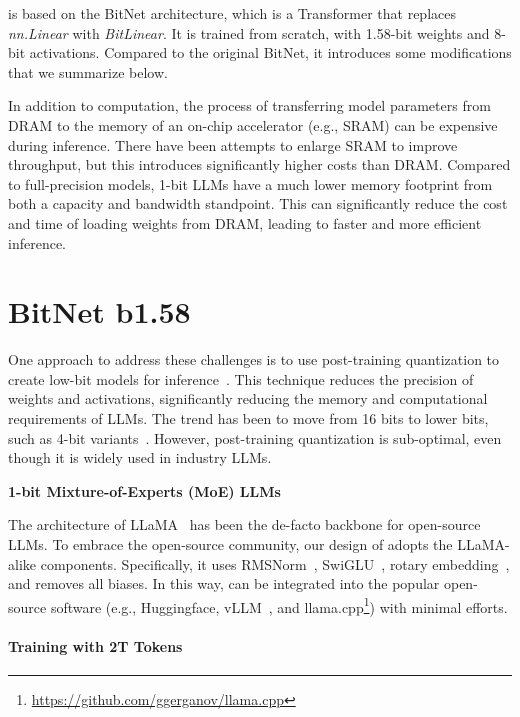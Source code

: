  is based on the BitNet architecture, which is a Transformer that replaces \emph{nn.Linear} with \emph{BitLinear}. It is trained from scratch, with 1.58-bit weights and 8-bit activations. Compared to the original BitNet, it introduces some modifications that we summarize below.

In addition to computation, the process of transferring model parameters from DRAM to the memory of an on-chip accelerator (e.g., SRAM) can be expensive during inference. There have been attempts to enlarge SRAM to improve throughput, but this introduces significantly higher costs than DRAM. Compared to full-precision models, 1-bit LLMs have a much lower memory footprint from both a capacity and bandwidth standpoint. This can significantly reduce the cost and time of loading weights from DRAM, leading to faster and more efficient inference.

\section{BitNet b1.58}

One approach to address these challenges is to use post-training quantization to create low-bit models for inference~\cite{smoothquant, gptq, quip, quip_sharp}. This technique reduces the precision of weights and activations, significantly reducing the memory and computational requirements of LLMs. The trend has been to move from 16 bits to lower bits, such as 4-bit variants~\cite{gptq, awq}. However, post-training quantization is sub-optimal, even though it is widely used in industry LLMs.

\textbf{1-bit Mixture-of-Experts (MoE) LLMs}

The architecture of LLaMA~\cite{llama, llama2} has been the de-facto backbone for open-source LLMs. To embrace the open-source community, our design of  adopts the LLaMA-alike components. Specifically, it uses RMSNorm~\cite{rmsnorm}, SwiGLU~\cite{swiglu}, rotary embedding~\cite{rope}, and removes all biases. In this way,  can be integrated into the popular open-source software (e.g., Huggingface, vLLM~\cite{vllm}, and llama.cpp\footnote{\url{https://github.com/ggerganov/llama.cpp}}) with minimal efforts.

\paragraph{Training with 2T Tokens}

